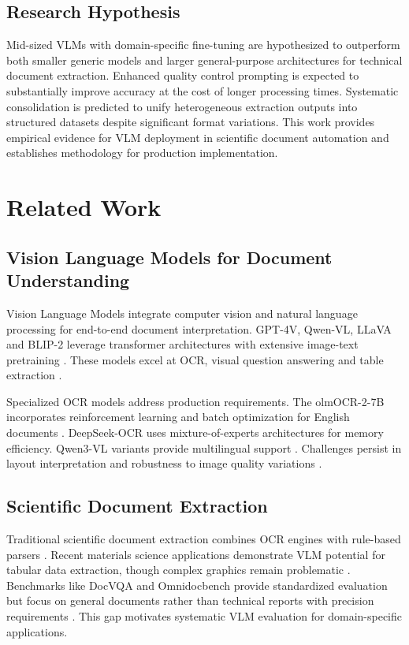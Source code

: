 \documentclass[conference]{IEEEtran}
\begin{document}
\subsection{Research Hypothesis}

Mid-sized VLMs with domain-specific fine-tuning are hypothesized to outperform both smaller generic models and larger general-purpose architectures for technical document extraction. Enhanced quality control prompting is expected to substantially improve accuracy at the cost of longer processing times. Systematic consolidation is predicted to unify heterogeneous extraction outputs into structured datasets despite significant format variations. This work provides empirical evidence for VLM deployment in scientific document automation and establishes methodology for production implementation.

\section{Related Work}

\subsection{Vision Language Models for Document Understanding}

Vision Language Models integrate computer vision and natural language processing for end-to-end document interpretation. GPT-4V, Qwen-VL, LLaVA and BLIP-2 leverage transformer architectures with extensive image-text pretraining \cite{carolan2024, huang2024}. These models excel at OCR, visual question answering and table extraction \cite{bansal2025, bai2024}.

Specialized OCR models address production requirements. The olmOCR-2-7B incorporates reinforcement learning and batch optimization for English documents \cite{e2e2025}. DeepSeek-OCR uses mixture-of-experts architectures for memory efficiency. Qwen3-VL variants provide multilingual support \cite{wen2023}. Challenges persist in layout interpretation and robustness to image quality variations \cite{bansal2025, schilling2024}.

\subsection{Scientific Document Extraction}

Traditional scientific document extraction combines OCR engines with rule-based parsers \cite{ryu2025}. Recent materials science applications demonstrate VLM potential for tabular data extraction, though complex graphics remain problematic \cite{schilling2024}. Benchmarks like DocVQA and Omnidocbench provide standardized evaluation but focus on general documents rather than technical reports with precision requirements \cite{bai2024, li2024}. This gap motivates systematic VLM evaluation for domain-specific applications.
\end{document}
